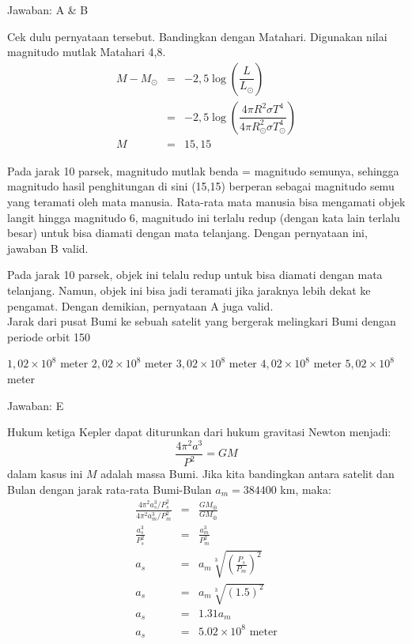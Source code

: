 \documentclass[11pt,fleqn]{exam}
\begin{document}
\begin{questions}
Jawaban: A \& B

Cek dulu pernyataan tersebut. Bandingkan dengan Matahari. Digunakan nilai magnitudo mutlak Matahari 4,8.\\

\begin{eqnarray*}
M-M_{\odot}&=&-2,5\log(\dfrac{L}{L_{\odot}})\\
&=&-2,5\log(\dfrac{4\pi R^{2}\sigma T^{4}}{4\pi R_{\odot}^{2}\sigma T_{\odot}^{4}})\\
M &=&15,15
\end{eqnarray*}

Pada jarak 10 parsek, magnitudo mutlak benda = magnitudo semunya, sehingga magnitudo hasil penghitungan di sini (15,15) berperan sebagai magnitudo semu yang teramati oleh mata manusia. Rata-rata mata manusia bisa mengamati objek langit hingga magnitudo 6, magnitudo ini terlalu redup (dengan kata lain terlalu besar) untuk bisa diamati dengan mata telanjang. Dengan pernyataan ini, jawaban B valid.

Pada jarak 10 parsek, objek ini telalu redup untuk bisa diamati dengan mata telanjang. Namun, objek ini bisa jadi teramati jika jaraknya lebih dekat ke pengamat. Dengan demikian, pernyataan A juga valid.\\


\question Jarak dari pusat Bumi ke sebuah satelit yang bergerak melingkari Bumi dengan periode orbit 150%
\begin{choices}
\choice $1,02 \times 10^{8}$ meter 
\choice $2,02 \times 10^{8}$ meter
\choice $3,02 \times 10^{8}$ meter
\choice $4,02 \times 10^{8}$ meter
\choice $5,02 \times 10^{8}$ meter
\end{choices}

Jawaban: E

Hukum ketiga Kepler dapat diturunkan dari hukum gravitasi Newton menjadi:\\
\begin{equation*}
\frac{4 \pi^{2} a^{3}}{P^{2}} = GM
\end{equation*}
dalam kasus ini $M$ adalah massa Bumi. Jika kita bandingkan antara satelit dan Bulan dengan jarak rata-rata Bumi-Bulan $a_m = 384400$ km, maka:
\begin{eqnarray*}
\frac{4 \pi^{2} a_{s}^{3}/P_{s}^{2}}{4 \pi^{2} a_{m}^{3}/P_{m}^{2}} &=& \frac{GM_{\oplus}}{GM_{\oplus}}\\
\frac{a_{s}^{3}}{P_{s}^{2}} &=& \frac{a_{m}^{3}}{P_{m}^{2}}\\
a_{s} &=& a_{m}  \sqrt[3]{\left( \frac{P_{s}}{P_{m}}\right)^{2}} \\
a_{s} &=& a_{m}  \sqrt[3]{\left(1.5\right)^{2}} \\
a_{s} &=& 1.31 a_{m}\\
a_{s} &=& 5.02 \times 10^{8} \text{  meter}
\end{eqnarray*}


\end{questions}
\end{document}
